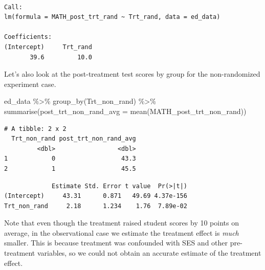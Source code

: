 \documentclass[
  letterpaper,
  DIV=11,
  numbers=noendperiod]{scrreprt}
\newenvironment{Shaded}{\begin{snugshade}}{\end{snugshade}}
\newcommand{\AttributeTok}[1]{\textcolor[rgb]{0.40,0.45,0.13}{#1}}
\newcommand{\FunctionTok}[1]{\textcolor[rgb]{0.28,0.35,0.67}{#1}}
\newcommand{\NormalTok}[1]{\textcolor[rgb]{0.00,0.23,0.31}{#1}}
\newcommand{\OtherTok}[1]{\textcolor[rgb]{0.00,0.23,0.31}{#1}}
\newcommand{\SpecialCharTok}[1]{\textcolor[rgb]{0.37,0.37,0.37}{#1}}
\theoremstyle{definition}
\theoremstyle{remark}
\begin{document}
\begin{verbatim}

Call:
lm(formula = MATH_post_trt_rand ~ Trt_rand, data = ed_data)

Coefficients:
(Intercept)     Trt_rand  
       39.6         10.0  
\end{verbatim}

Let's also look at the post-treatment test scores by group for the
non-randomized experiment case.

\begin{Shaded}
\begin{Highlighting}[]
\NormalTok{ed\_data }\SpecialCharTok{\%\textgreater{}\%} 
  \FunctionTok{group\_by}\NormalTok{(Trt\_non\_rand) }\SpecialCharTok{\%\textgreater{}\%} 
  \FunctionTok{summarise}\NormalTok{(}\AttributeTok{post\_trt\_non\_rand\_avg =} \FunctionTok{mean}\NormalTok{(MATH\_post\_trt\_non\_rand))}
\end{Highlighting}
\end{Shaded}

\begin{verbatim}
# A tibble: 2 x 2
  Trt_non_rand post_trt_non_rand_avg
         <dbl>                 <dbl>
1            0                  43.3
2            1                  45.5
\end{verbatim}

\begin{Shaded}
\end{Shaded}

\begin{verbatim}
             Estimate Std. Error t value  Pr(>|t|)
(Intercept)     43.31      0.871   49.69 4.37e-156
Trt_non_rand     2.18      1.234    1.76  7.89e-02
\end{verbatim}

Note that even though the treatment raised student scores by 10 points
on average, in the observational case we estimate the treatment effect
is \emph{much} smaller. This is because treatment was confounded with
SES and other pre-treatment variables, so we could not obtain an
accurate estimate of the treatment effect.
\end{document}
